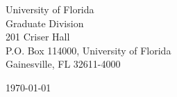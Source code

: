 \begin{minipage}{0.49\textwidth}
\begin{flushleft}
\noindent
University of Florida \\
Graduate Division\\
201 Criser Hall\\
P.O. Box 114000, University of Florida\\
Gainesville, FL 32611-4000\\

\end{flushleft}
\end{minipage}
\begin{minipage}{0.47\textwidth}
\begin{flushright}
\today
\end{flushright}
\end{minipage} \\

\newcommand{\univ}{University of Florida}
\newcommand{\univshort}{UFL}
\newcommand{\degree}{Ph.D.}
\newcommand{\dept}{Computer Science}


